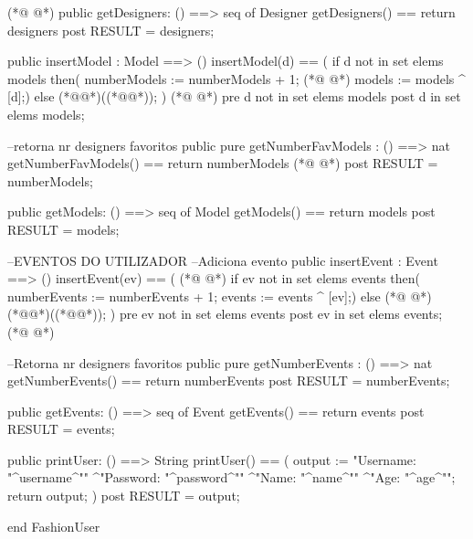 \begin{vdmpp}[breaklines=true]
(*@
\label{insertModel:77}
@*)
   public getDesigners: () ==> seq of Designer
   getDesigners() == return designers
   post RESULT = designers;
   
   public insertModel : Model ==> ()
   insertModel(d) ==
   (
    if d not in set elems models 
     then(
     numberModels := numberModels + 1;
(*@
\label{getNumberFavModels:87}
@*)
     models := models ^ [d];)
     else
     (*@@*)((*@@*));
   )
(*@
\label{getModels:91}
@*)
   pre d not in set elems models
   post d in set elems models;
   
  --retorna nr designers favoritos
   public pure getNumberFavModels : () ==> nat
   getNumberFavModels() == return numberModels
(*@
\label{insertEvent:97}
@*)
   post RESULT = numberModels;
   
   public getModels: () ==> seq of Model
   getModels() == return models
    post RESULT = models;
   
    --EVENTOS DO UTILIZADOR
    --Adiciona evento
  public insertEvent : Event ==> ()
   insertEvent(ev) ==
   (
(*@
\label{getNumberEvents:108}
@*)
    if ev not in set elems events
     then(
     numberEvents := numberEvents + 1;
     events := events ^ [ev];)
     else 
(*@
\label{getEvents:113}
@*)
     (*@@*)((*@@*));
   )
   pre ev not in set elems events
   post ev in set elems events;
(*@
\label{printUser:117}
@*)
   
   
  --Retorna nr designers favoritos
   public pure getNumberEvents : () ==> nat
   getNumberEvents() == return numberEvents
  post RESULT = numberEvents;
  

   public getEvents: () ==> seq of Event
   getEvents() == return events
   post RESULT = events;
   
   public printUser: () ==> String
  printUser() == (
  output := "Username: "^username^"\n"
       ^"Password: "^password^"\n"
       ^"Name: "^name^"\n"
       ^"Age: "^age^"\n";
  return output;
  )
   post RESULT = output;
   
end FashionUser
\end{vdmpp}
\bigskip
